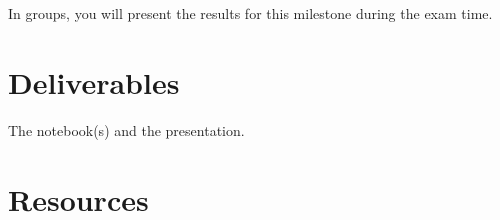 In groups, you will present the results for this milestone during the
exam time.

\section{Deliverables}

The notebook(s) and the presentation.

\section{Resources}

\renewcommand{\addcontentsline}[3]{}%




